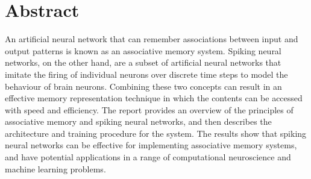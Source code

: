 \chapter*{\centering Abstract}%
\begin{center}
\end{center}

An artificial neural network that can remember associations between input and
output patterns is known as an associative memory system. Spiking neural
networks, on the other hand, are a subset of artificial neural networks that
imitate the firing of individual neurons over discrete time steps to model the
behaviour of brain neurons. Combining these two concepts can result in an
effective memory representation technique in which the contents can be accessed
with speed and efficiency. The report provides an overview of the principles of
associative memory and spiking neural networks, and then describes the
architecture and training procedure for the system. The results show that
spiking neural networks can be effective for implementing associative memory
systems, and have potential applications in a range of computational
neuroscience and machine learning problems.

\begin{flushright}

\end{flushright}

\thispagestyle{plain}